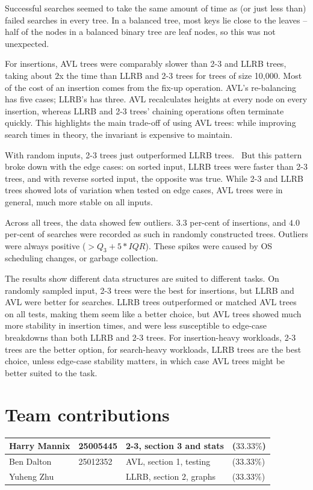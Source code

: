 \documentclass[12pt]{article}
\begin{document}
Successful searches seemed to take the same amount of time as (or just less than) failed searches in every tree. In a balanced tree, most keys lie close to the leaves – half of the nodes in a balanced binary tree are leaf nodes, so this was not unexpected. 

For insertions, AVL trees were comparably slower than 2-3 and LLRB trees, taking about $2$x the time than LLRB and 2-3 trees for trees of size 10,000. Most of the cost of an insertion comes from the fix-up operation. AVL’s re-balancing has five cases; LLRB's has three. AVL recalculates heights at every node on every insertion, whereas LLRB and 2-3 trees' chaining operations often terminate quickly. This highlights the main trade-off of using AVL trees: while improving search times in theory, the invariant is expensive to maintain.

With random inputs, 2-3 trees just outperformed LLRB trees.  But this pattern broke down with the edge cases: on sorted input, LLRB trees were faster than 2-3 trees, and with reverse sorted input, the opposite was true.  While 2-3 and LLRB trees showed lots of variation when tested on edge cases, AVL trees were in general, much more stable on all inputs.

Across all trees, the data showed few outliers. $3.3$ per-cent of  insertions, and $4.0$ per-cent of searches were recorded as such in randomly constructed trees. Outliers were always positive ($> Q_3 + 5*IQR$). These spikes were caused by OS scheduling changes, or garbage collection. 

The results show different data structures are suited to different tasks. On randomly sampled input, 2-3 trees were the best for insertions, but LLRB and AVL were better for searches. LLRB trees outperformed or matched AVL trees on all tests, making them seem like a better choice, but AVL trees showed much more stability in insertion times, and were less susceptible to edge-case breakdowns than both LLRB and 2-3 trees. For insertion-heavy workloads, 2-3 trees are the better option, for search-heavy workloads, LLRB trees are the best choice, unless edge-case stability matters, in which case AVL trees might be better suited to the task.
\vspace{-1em}
\section{Team contributions}
\begin{tabular}{|l|l|l|l|}
\hline
Harry Mannix&  25005445&  2-3, section 3 and stats& ($33.33\%$)\\\hline
          Ben Dalton&            25012352&         AVL, section 1, testing&          ($33.33\%$)\\
\hline
 Yuheng Zhu& & LLRB, section 2, graphs&($33.33\%$)\\\hline
\end{tabular}
\vspace{-1em}
\printbibliography
\end{document}
